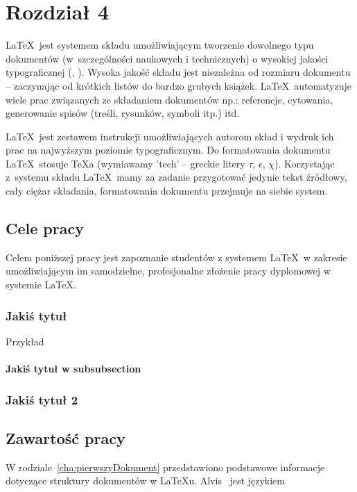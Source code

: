 \chapter{Rozdział 4}
\label{cha:wprowadzenie}

\LaTeX~jest systemem składu umożliwiającym tworzenie dowolnego typu dokumentów (w~szczególności naukowych i technicznych) o wysokiej jakości typograficznej (\cite{Dil00}, \cite{Lam92}). Wysoka jakość składu jest niezależna od rozmiaru dokumentu -- zaczynając od krótkich listów do bardzo grubych książek. \LaTeX~automatyzuje wiele prac związanych ze składaniem dokumentów np.: referencje, cytowania, generowanie spisów (treśli, rysunków, symboli itp.) itd.

\LaTeX~jest zestawem instrukcji umożliwiających autorom skład i wydruk ich prac na najwyższym poziomie typograficznym. Do formatowania dokumentu \LaTeX~stosuje \TeX a (wymiawamy 'tech' -- greckie litery $\tau$, $\epsilon$, $\chi$). Korzystając z~systemu składu \LaTeX~mamy za zadanie przygotować jedynie tekst źródłowy, cały ciężar składania, formatowania dokumentu przejmuje na siebie system.


\section{Cele pracy}
\label{sec:celePracy}


Celem poniższej pracy jest zapoznanie studentów z systemem \LaTeX~w zakresie umożliwiającym im samodzielne, profesjonalne złożenie pracy dyplomowej w systemie \LaTeX.

\subsection{Jakiś tytuł}
Przykład
\subsubsection{Jakiś tytuł w subsubsection}


\subsection{Jakiś tytuł 2}


\section{Zawartość pracy}
\label{sec:zawartoscPracy}

W rodziale~\ref{cha:pierwszyDokument} przedstawiono podstawowe informacje dotyczące struktury dokumentów w \LaTeX u. Alvis~\cite{Alvis2011} jest językiem 
